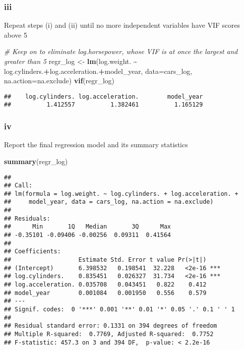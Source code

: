 \documentclass[
]{article}
\newenvironment{Shaded}{\begin{snugshade}}{\end{snugshade}}
\newcommand{\AttributeTok}[1]{\textcolor[rgb]{0.13,0.29,0.53}{#1}}
\newcommand{\CommentTok}[1]{\textcolor[rgb]{0.56,0.35,0.01}{\textit{#1}}}
\newcommand{\FunctionTok}[1]{\textcolor[rgb]{0.13,0.29,0.53}{\textbf{#1}}}
\newcommand{\NormalTok}[1]{#1}
\newcommand{\OtherTok}[1]{\textcolor[rgb]{0.56,0.35,0.01}{#1}}
\newcommand{\SpecialCharTok}[1]{\textcolor[rgb]{0.81,0.36,0.00}{\textbf{#1}}}
\begin{document}
\hypertarget{iii-2}{%
\subsubsection{iii}\label{iii-2}}

Repeat steps (i) and (ii) until no more independent variables have VIF
scores above 5

\begin{Shaded}
\begin{Highlighting}[]
\CommentTok{\# Keep on to eliminate log.horsepower, whose VIF is at once the largest and greater than 5}
\NormalTok{regr\_log }\OtherTok{\textless{}{-}} \FunctionTok{lm}\NormalTok{(log.weight. }\SpecialCharTok{\textasciitilde{}}\NormalTok{ log.cylinders.}\SpecialCharTok{+}\NormalTok{log.acceleration.}\SpecialCharTok{+}\NormalTok{model\_year,}
                 \AttributeTok{data=}\NormalTok{cars\_log, }\AttributeTok{na.action=}\NormalTok{na.exclude)}
\FunctionTok{vif}\NormalTok{(regr\_log)}
\end{Highlighting}
\end{Shaded}

\begin{verbatim}
##    log.cylinders. log.acceleration.        model_year 
##          1.412557          1.382461          1.165129
\end{verbatim}

\hypertarget{iv-1}{%
\subsubsection{iv}\label{iv-1}}

Report the final regression model and its summary statistics

\begin{Shaded}
\begin{Highlighting}[]
\FunctionTok{summary}\NormalTok{(regr\_log)}
\end{Highlighting}
\end{Shaded}

\begin{verbatim}
## 
## Call:
## lm(formula = log.weight. ~ log.cylinders. + log.acceleration. + 
##     model_year, data = cars_log, na.action = na.exclude)
## 
## Residuals:
##      Min       1Q   Median       3Q      Max 
## -0.35101 -0.09406 -0.00256  0.09311  0.41564 
## 
## Coefficients:
##                   Estimate Std. Error t value Pr(>|t|)    
## (Intercept)       6.398532   0.198541  32.228   <2e-16 ***
## log.cylinders.    0.835451   0.026327  31.734   <2e-16 ***
## log.acceleration. 0.035708   0.043451   0.822    0.412    
## model_year        0.001084   0.001950   0.556    0.579    
## ---
## Signif. codes:  0 '***' 0.001 '**' 0.01 '*' 0.05 '.' 0.1 ' ' 1
## 
## Residual standard error: 0.1331 on 394 degrees of freedom
## Multiple R-squared:  0.7769, Adjusted R-squared:  0.7752 
## F-statistic: 457.3 on 3 and 394 DF,  p-value: < 2.2e-16
\end{verbatim}
\end{document}
